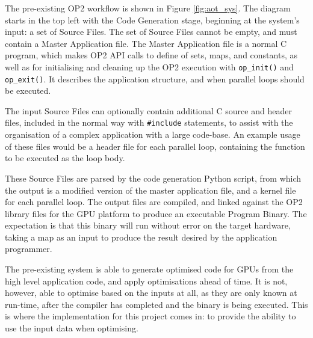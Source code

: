 \noindent The pre-existing OP2 workflow is shown in Figure \ref{fig:aot_sys}. The diagram starts in the top left with the Code Generation stage, beginning at the system's input: a set of Source Files. The set of Source Files cannot be empty, and must contain a Master Application file. The Master Application file is a normal C program, which makes OP2 API calls to define of sets, maps, and constants, as well as for initialising and cleaning up the OP2 execution with \verb|op_init()| and \verb|op_exit()|. It describes the application structure, and when parallel loops should be executed.
\par
The input Source Files can optionally contain additional C source and header files, included in the normal way with \verb|#include| statements, to assist with the organisation of a complex application with a large code-base. An example usage of these files would be a header file for each parallel loop, containing the function to be executed as the loop body.
\par
These Source Files are parsed by the code generation Python script, from which the output is a modified version of the master application file, and a kernel file for each parallel loop. The output files are compiled, and linked against the OP2 library files for the GPU platform to produce an executable Program Binary. The expectation is that this binary will run without error on the target hardware, taking a map as an input to produce the result desired by the application programmer.
\par
The pre-existing system is able to generate optimised code for GPUs from the high level application code, and apply optimisations ahead of time. It is not, however, able to optimise based on the inputs at all, as they are only known at run-time, after the compiler has completed and the binary is being executed. This is where the implementation for this project comes in: to provide the ability to use the input data when optimising.


